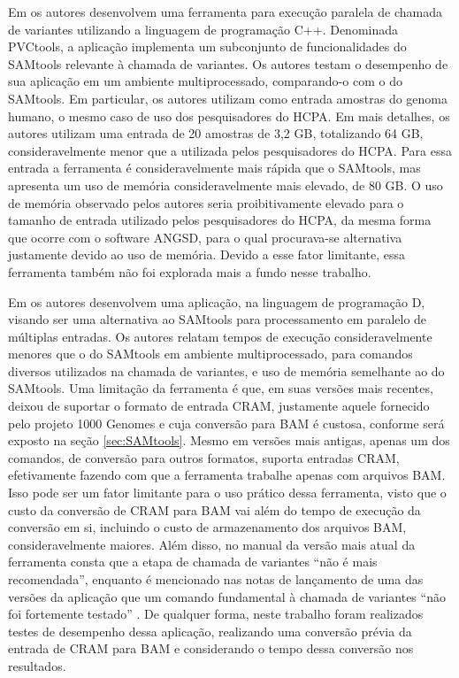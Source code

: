 \documentclass[cic,tc]{iiufrgs}
\begin{document}
Em \cite{jin2019pvctools} os autores desenvolvem uma ferramenta para execução
paralela de chamada de variantes utilizando a linguagem de programação C++.
Denominada PVCtools, a aplicação implementa um subconjunto de funcionalidades
do SAMtools relevante à chamada de variantes. Os autores testam o desempenho de
sua aplicação em um ambiente multiprocessado, comparando-o com o do SAMtools.
Em particular, os autores utilizam como entrada amostras do genoma humano,
o mesmo caso de uso dos pesquisadores do HCPA. Em mais detalhes, os
autores utilizam uma entrada de 20 amostras de 3,2 GB, totalizando 64 GB,
consideravelmente menor que a utilizada pelos pesquisadores do HCPA. Para essa
entrada a ferramenta é consideravelmente mais rápida que o SAMtools, mas
apresenta um uso de memória consideravelmente mais elevado, de 80 GB. O uso de
memória observado pelos autores seria proibitivamente elevado para o tamanho de
entrada utilizado pelos pesquisadores do HCPA, da mesma forma que ocorre com o
software ANGSD, para o qual procurava-se alternativa justamente devido ao uso
de memória. Devido a esse fator limitante, essa ferramenta também não foi
explorada mais a fundo nesse trabalho.

Em \cite{tarasov2015sambamba} os autores desenvolvem uma aplicação, na
linguagem de programação D, visando ser uma alternativa ao SAMtools para
processamento em paralelo de múltiplas entradas. Os autores relatam tempos de
execução consideravelmente menores que o do SAMtools em ambiente
multiprocessado, para comandos diversos utilizados na chamada de variantes, e
uso de memória semelhante ao do SAMtools. Uma limitação da ferramenta é que, em
suas versões mais recentes, deixou de suportar o formato de entrada CRAM,
justamente aquele fornecido pelo projeto 1000 Genomes e cuja conversão para BAM é
custosa, conforme será exposto na seção \ref{sec:SAMtools}. Mesmo em versões
mais antigas, apenas um dos comandos, de conversão para outros formatos,
suporta entradas CRAM, efetivamente fazendo com que a ferramenta trabalhe
apenas com arquivos BAM. Isso pode ser um fator limitante para o uso prático
dessa ferramenta, visto que o custo da conversão de CRAM para BAM vai além do
tempo de execução da conversão em si, incluindo o custo de armazenamento dos
arquivos BAM, consideravelmente maiores. Além disso, no manual da versão mais
atual da ferramenta consta que a etapa de chamada de variantes ``não é mais
recomendada'', enquanto é mencionado nas notas de lançamento de uma das versões
da aplicação que um comando fundamental à chamada de variantes ``não foi
fortemente testado'' \cite{manual2015sambamba}. De qualquer forma, neste
trabalho foram realizados testes de desempenho dessa aplicação, realizando uma
conversão prévia da entrada de CRAM para BAM e considerando o tempo dessa
conversão nos resultados.
\end{document}
